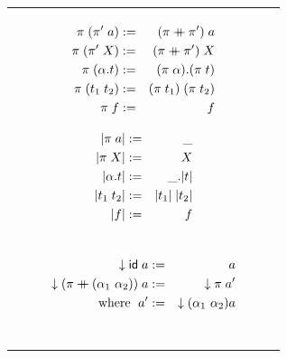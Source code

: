 \documentclass[english, mgr]{iithesis}
\begin{document}
\begin{figure}[htbp]
  \centering
  \begin{tabularx}{\textwidth}{|C|}
    \hline
    \begin{subfigure}{0.45\textwidth}
      \begin{eqnarray*}
        \perm \apperm (\perm' \apperm \atomv)  & := & (\perm \++ \perm') \apperm \atomv \\
        \perm \apperm (\perm' \apperm \termv)  & := & (\perm \++ \perm') \apperm \termv \\
        \perm \apperm (\tbind{\atomexp} \term) & := & \tbind{(\perm \apperm \atomexp)} (\perm \apperm \term) \\
        \perm \apperm (\term_1 \tapp \term_2)  & := & (\perm \apperm \term_1) \tapp (\perm \apperm \term_2) \\
        \perm \apperm \symb                    & := & \symb \\
      \end{eqnarray*}
    \end{subfigure}
    \begin{subfigure}{0.45\textwidth}
      \begin{eqnarray*}
        |\pi \; a|   & := & \_ \\
        |\pi \; X|   & := & X  \\
        |\alpha. t| & := & \_. |t| \\
        |t_1 \; t_2|  & := & |t_1| \; |t_2| \\
        |f|                  & := & f \\
      \end{eqnarray*}
    \end{subfigure}
    \\
    \begin{subfigure}{0.42\textwidth}
      \begin{eqnarray*}
        \normal{\permid \apperm \atomv}  & := & \atomv \\
        \normal{(\perm \++ \swap{\atomexp_1}{\atomexp_2}) \apperm \atomv}  & := & \normal{\perm \apperm \atomv'} \\
        \text{where }\; \atomv' & := &  \normal {\permswap{\atomexp_1}{\atomexp_2}{\atomv}} \\
        & & \\
      \end{eqnarray*}
    \end{subfigure}

\end{tabularx}
\end{figure}
\end{document}
